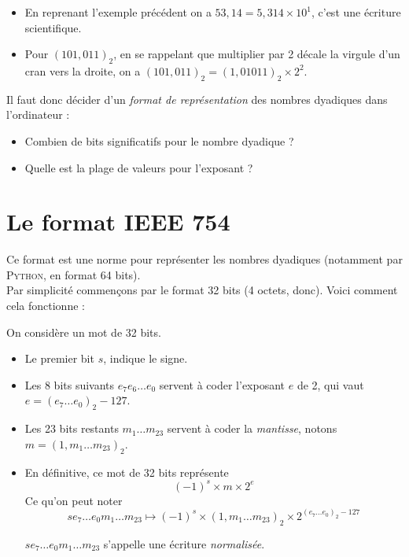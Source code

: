 \begin{exemple}
    \begin{itemize}
        \item   En reprenant l'exemple précédent on a $53,14=5,314\times 10^1$, c'est une écriture scientifique.
        \item   Pour $(101,011)_2$, en se rappelant que multiplier par 2 décale la virgule d'un cran vers la droite, on a $(101,011)_2=(1,01011)_2\times
                  2^2$.
    \end{itemize}
\end{exemple}

Il faut donc décider d'un \textit{format de représentation} des nombres dyadiques dans l'ordinateur :
\begin{itemize}
    \item   Combien de bits significatifs pour le nombre dyadique ?
    \item   Quelle est la plage de valeurs pour l'exposant ?
\end{itemize}
\section{Le format IEEE 754}

Ce format est une norme pour représenter les nombres dyadiques (notamment par \textsc{Python}, en format 64 bits).\\
Par simplicité commençons par le format 32 bits (4 octets, donc).
Voici comment cela fonctionne :

\begin{definition}
    On considère un mot de 32 bits.
    \begin{itemize}
        \item Le premier bit $s$, indique le signe.
        \item Les 8 bits suivants  $e_7e_6\ldots e_0$ servent à coder l'exposant $e$ de 2, qui vaut $e=(e_7\ldots e_0)_2-127$.
        \item Les 23 bits restants $m_1\ldots m_{23}$ servent à coder la \textit{mantisse}, notons $m=(1,m_1\ldots m_{23})_2$.
        \item En définitive, ce mot de 32 bits représente $$\boxed{(-1)^s\times m\times 2^e}$$
              Ce qu'on peut noter
              $$se_7\ldots e_0m_1\ldots m_{23}\mapsto (-1)^s\times(1,m_1\ldots m_{23})_2\times 2^{(e_7\ldots e_0)_2-127}$$

              $se_7\ldots e_0m_1\ldots m_{23}$ s'appelle une écriture \textit{normalisée}.
    \end{itemize}
\end{definition}

